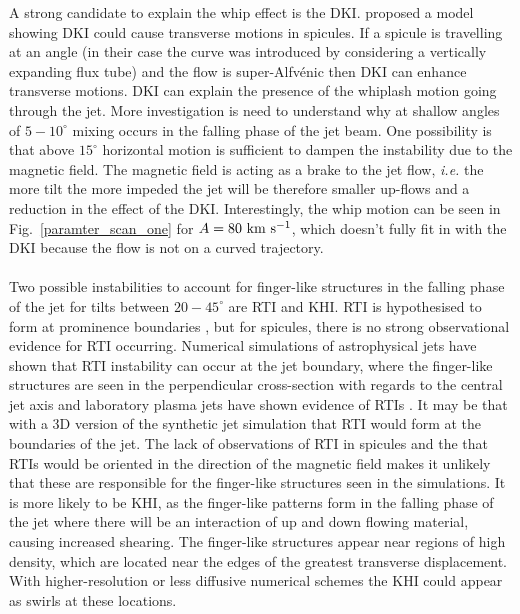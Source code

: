 \documentclass[12pt]{ociamthesis}
\newcommand{\Alfvenic}{Alfv\'{e}nic }
\newcommand{\kms}{~\rm{km ~s^{-1}}}
\newcommand{\np}{\\ \\}
\newcommand{\degs}{^{\circ}}
\begin{document}
%
A strong candidate to explain the whip effect is the DKI. \cite{Zaqarashvili2020ApJ893L46Z} proposed a model showing DKI could cause transverse motions in spicules. If a spicule is travelling at an angle (in their case the curve was introduced by considering a vertically expanding flux tube) and the flow is super-\Alfvenic then DKI can enhance transverse motions. DKI can explain the presence of the whiplash motion going through the jet. More investigation is need to understand why at shallow angles of $5-10\degs$ mixing occurs in the falling phase of the jet beam. One possibility is that above $15^{\circ}$ horizontal motion is sufficient to dampen the instability due to the magnetic field. The magnetic field is acting as a brake to the jet flow, \textit{i.e.} the more tilt the more impeded the jet will be therefore smaller up-flows and a reduction in the effect of the DKI. Interestingly, the whip motion can be seen in Fig.~\ref{paramter_scan_one} for $A=80 \kms$, which doesn't fully fit in with the DKI because the flow is not on a curved trajectory. \np 
Two possible instabilities to account for finger-like structures in the falling phase of the jet for tilts between $20-45\degs$ are RTI and KHI. RTI is hypothesised to form at prominence boundaries \citep{Berger2008ApJ676L89B,Berger2010ApJ7161288B,Hillier2012ApJ746120H,Berger2017ApJ85060B}, but for spicules, there is no strong observational evidence for RTI occurring. Numerical simulations of astrophysical jets have shown that RTI instability can occur at the jet boundary, where the finger-like structures are seen in the perpendicular cross-section with regards to the central jet axis \citep{Toma2017MNRAS4721253T,Matsumoto2017MNRAS4721421M} and laboratory plasma jets have shown evidence of RTIs \citep{Zhai2016PhPl23c2121Z}. It may be that with a 3D version of the synthetic jet simulation that RTI would form at the boundaries of the jet. The lack of observations of RTI in spicules and the that RTIs would be oriented in the direction of the magnetic field makes it unlikely that these are responsible for the finger-like structures seen in the simulations. It is more likely to be KHI, as the finger-like patterns form in the falling phase of the jet where there will be an interaction of up and down flowing material, causing increased shearing. The finger-like structures appear near regions of high density, which are located near the edges of the greatest transverse displacement. With higher-resolution or less diffusive numerical schemes the KHI could appear as swirls at these locations. \np
\end{document}
